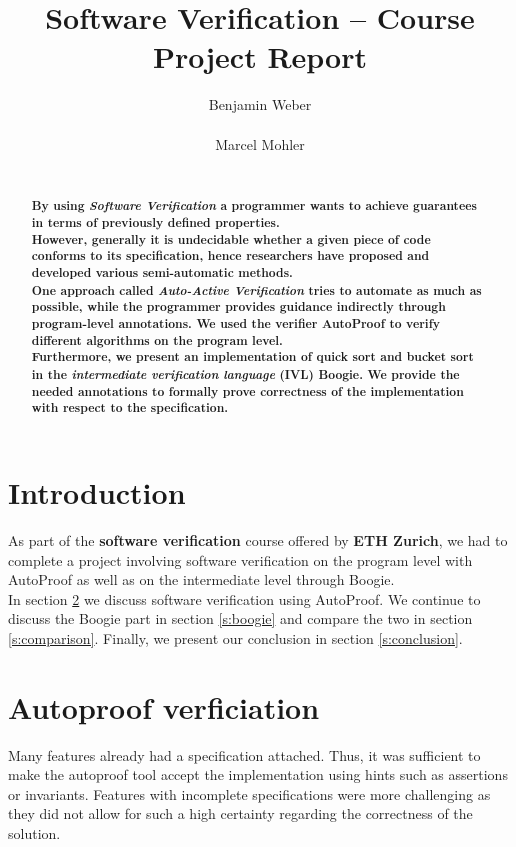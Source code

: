 \documentclass{report}
\title{Software Verification -- Course Project Report}
\author{
%
%
\alignauthor Benjamin Weber\\
	\affaddr{ETH ID 11-933-017}\\
	\email{benweber@student.ethz.ch}
\alignauthor Marcel Mohler\\
	\affaddr{ETH ID 09-922-998}\\
	\email{mohlerm@student.ethz.ch}
}
\begin{document}
\maketitle

\begin{abstract}
\textbf{By using \textit{Software Verification} a programmer wants to achieve guarantees in terms of previously defined properties.\\
However, generally it is undecidable whether a given piece of code conforms to its specification, hence researchers have proposed and developed various semi-automatic methods.\\
One approach called \textit{Auto-Active Verification} tries to automate as much as possible, while the programmer provides guidance indirectly through program-level annotations\cite{autoactivelecture}.
We used the verifier AutoProof\cite{autoproof} to verify different algorithms on the program level. \\Furthermore, we present an implementation of quick sort\cite{quicksort} and bucket sort\cite{bucketsort} in the \textit{intermediate verification language} (IVL) Boogie\cite{boogie}. We provide the needed annotations to formally prove correctness of the implementation with respect to the specification.
}
\end{abstract}

\section{Introduction}
\label{s:introduction}
As part of the \textbf{software verification} course offered by \textbf{ETH Zurich},
we had to complete a project involving software verification on the program
level with AutoProof as well as on the intermediate level through Boogie.\\
In section \ref{s:autoproof} we discuss software verification using AutoProof.
We continue to discuss the Boogie part in section \ref{s:boogie} and compare
the two in section \ref{s:comparison}. Finally, we present our conclusion in
section \ref{s:conclusion}.

\section{Autoproof verficiation}
\label{s:autoproof}

Many features already had a specification attached. Thus, it was sufficient to
make the autoproof tool accept the implementation using hints such as assertions
or invariants. Features with incomplete specifications were more challenging as
they did not allow for such a high certainty regarding the correctness of the
solution.
\end{document}

